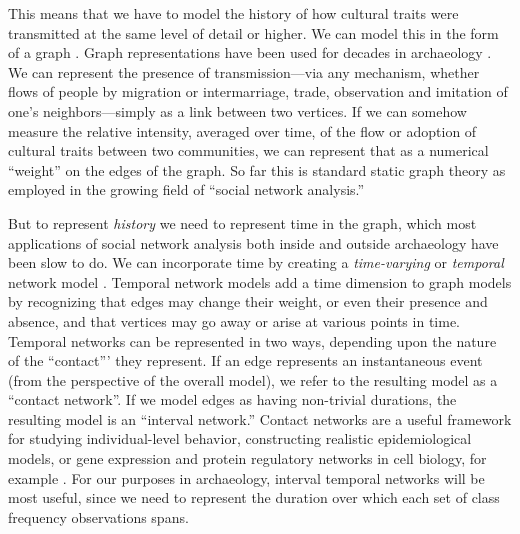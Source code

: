     This means that we have to model the history of how cultural traits were transmitted at the same level of detail or higher.  We can model this in the form of a graph \citep{diestel2010graph,Harary1969}.  Graph representations have been used for decades in archaeology . We can represent the presence of transmission---via any mechanism, whether flows of people by migration or intermarriage, trade, observation and imitation of one's neighbors---simply as a link between two vertices.  If we can somehow measure the relative intensity, averaged over time, of the flow or adoption of cultural traits between two communities, we can represent that as a numerical ``weight'' on the edges of the graph.  So far this is standard static graph theory as employed in the growing field of ``social network analysis.''  
    
    But to represent \emph{history} we need to represent time in the graph, which most applications of social network analysis both inside and outside archaeology have been slow to do.  We can incorporate time by creating a \emph{time-varying} or \emph{temporal} network model \citep{Holme2012}.  Temporal network models add a time dimension to graph models by recognizing that edges may change their weight, or even their presence and absence, and that vertices may go away or arise at various points in time.  Temporal networks can be represented in two ways, depending upon the nature of the ``contact''' they represent.  If an edge represents an instantaneous event (from the perspective of the overall model), we refer to the resulting model as a ``contact network''.  If we model edges as having non-trivial durations, the resulting model is an ``interval network.''  Contact networks are a useful framework for studying individual-level behavior, constructing realistic epidemiological models, or gene expression and protein regulatory networks in cell biology, for example \citep{holme2012temporal}.  For our purposes in archaeology, interval temporal networks will be most useful, since we need to represent the duration over which each set of class frequency observations spans.  
    
